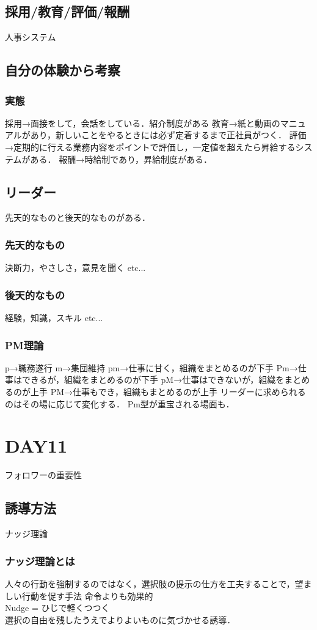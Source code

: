 \documentclass[a4paper,11pt]{ltjsarticle}
\begin{document}
\subsection{採用/教育/評価/報酬}
人事システム
\subsection{自分の体験から考察}
\subsubsection{実態}
採用→面接をして，会話をしている．紹介制度がある
教育→紙と動画のマニュアルがあり，新しいことをやるときには必ず定着するまで正社員がつく．
評価→定期的に行える業務内容をポイントで評価し，一定値を超えたら昇給するシステムがある．
報酬→時給制であり，昇給制度がある．

\subsection{リーダー}
先天的なものと後天的なものがある．
\subsubsection{先天的なもの}
決断力，やさしさ，意見を聞く etc...
\subsubsection{後天的なもの}
経験，知識，スキル etc...
\subsubsection{PM理論}
p→職務遂行
m→集団維持
pm→仕事に甘く，組織をまとめるのが下手
Pm→仕事はできるが，組織をまとめるのが下手
pM→仕事はできないが，組織をまとめるのが上手
PM→仕事もでき，組織もまとめるのが上手
リーダーに求められるのはその場に応じて変化する．
Pm型が重宝される場面も．
\section{DAY11}
フォロワーの重要性
\subsection{誘導方法}
ナッジ理論
\subsubsection{ナッジ理論とは}
人々の行動を強制するのではなく，選択肢の提示の仕方を工夫することで，望ましい行動を促す手法
命令よりも効果的\\
Nudge = ひじで軽くつつく\\
選択の自由を残したうえでよりよいものに気づかせる誘導．
\end{document}

